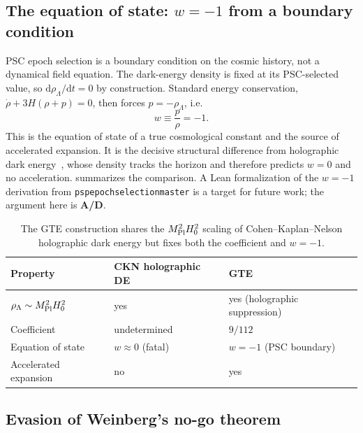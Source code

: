 \documentclass[11pt]{article}
\theoremstyle{remark}
\newcommand{\lean}[1]{%
  \penalty-100
  \begingroup\def\_{\textunderscore\allowbreak}\texttt{#1}\endgroup}
\newcommand{\MPl}{M_{\rm Pl}}
\newcommand{\Hnought}{H_0}
\newcommand{\CatAD}{\textbf{A/D}}
\begin{document}
\subsection{The equation of state: $w = -1$ from a boundary condition}
\label{sec:cc-eos}

PSC epoch selection is a boundary condition on the cosmic history, not a dynamical
field equation. The dark-energy density is fixed at its PSC-selected value, so
$\mathrm{d}\rho_\Lambda/\mathrm{d}t = 0$ by construction. Standard energy
conservation, $\dot\rho + 3H(\rho + p) = 0$, then forces $p = -\rho_\Lambda$, i.e.
\begin{equation}
  w \equiv \frac{p}{\rho} = -1.
\end{equation}
This is the equation of state of a true cosmological constant and the source of
accelerated expansion. It is the decisive structural difference from holographic
dark energy~\cite{CohenKaplanNelson1999,Hsu2004}, whose density tracks the horizon
and therefore predicts $w = 0$ and no acceleration.  summarizes the
comparison. A Lean formalization of the $w = -1$ derivation from
\lean{psp\_epoch\_selection\_master} is a target for future work; the argument here
is \CatAD.

\begin{table}[h]
\centering
\small
\begin{tabularx}{\textwidth}{@{}P{4.5cm}P{4.5cm}P{4.5cm}@{}}
\toprule
\textbf{Property} & \textbf{CKN holographic DE} & \textbf{GTE} \\
\midrule
$\rho_\Lambda \sim \MPl^2\Hnought^2$ & yes & yes (holographic suppression) \\
Coefficient & undetermined & $9/112$ \\
Equation of state & $w \approx 0$ (fatal) & $w = -1$ (PSC boundary) \\
Accelerated expansion & no & yes \\
\bottomrule
\end{tabularx}
\caption{The GTE construction shares the $\MPl^2\Hnought^2$ scaling of
Cohen--Kaplan--Nelson holographic dark energy but fixes both the coefficient and
$w = -1$.}
\label{tab:ckn}
\end{table}

\subsection{Evasion of Weinberg's no-go theorem}
\label{sec:cc-weinberg}
\end{document}
